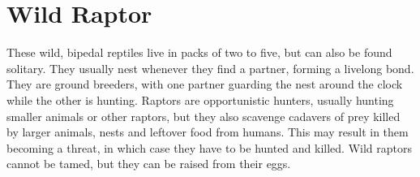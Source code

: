 \section{Wild Raptor}

These wild, bipedal reptiles live in packs of two to five, but can also be found solitary. They usually nest whenever they find a partner, forming a livelong bond. They are ground breeders, with one partner guarding the nest around the clock while the other is hunting. Raptors are opportunistic hunters, usually hunting smaller animals or other raptors, but they also scavenge cadavers of prey killed by larger animals, nests and leftover food from humans. This may result in them becoming a threat, in which case they have to be hunted and killed. Wild raptors cannot be tamed, but they can be raised from their eggs.